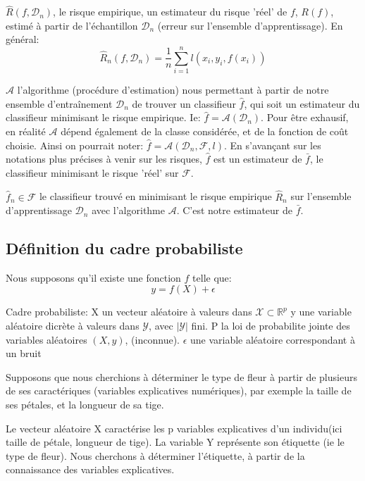 \documentclass[a4paper]{article}
\theoremstyle{plain}
\begin{document}
\begin{outline}
\2 $\hat R(f, \mathcal{D}_n)$, le risque empirique, un estimateur du risque 'réel' de $f$, $R(f)$, estimé à partir de l'échantillon $\mathcal{D}_n$ (erreur sur l'ensemble d'apprentissage). En général: $$\hat R_n(f, \mathcal{D}_n) = \frac{1}{n}\sum_{i=1}^{n}\mathit{l}(x_i,y_i,f(x_i))$$

\2 $\mathcal{A}$ l'algorithme (procédure d'estimation) nous permettant à partir de notre ensemble d'entraînement $\mathcal{D}_n$ de trouver un classifieur $\hat f$, qui soit un estimateur du classifieur minimisant le risque empirique. Ie: $\hat f = \mathcal{A}(\mathcal{D}_n) $. Pour être exhausif, en réalité $\mathcal{A}$ dépend également de la classe considérée, et de la fonction de coût choisie. Ainsi on pourrait noter: $\hat f = \mathcal{A}(\mathcal{D}_n,\mathcal{F},l)$. En s'avançant sur les notations plus précises à venir sur les risques, $\hat f$ est un estimateur de $\bar f$, le classifieur  minimisant le risque 'réel' sur $\mathcal{F}$.

\2 $\hat f_n \in \mathcal{F}$ le classifieur trouvé en minimisant le risque empirique $\hat R_n$ sur l'ensemble d'apprentissage $\mathcal{D}_n$ avec l'algorithme $\mathcal{A}$. C'est notre estimateur de $\bar f$.


\end{outline}

\subsection{Définition du cadre probabiliste}
Nous supposons qu'il existe une fonction $f$ telle que: 
$$ y = f(X) + \epsilon$$

\begin{outline}

\1 Cadre probabiliste:
\2 X un vecteur aléatoire à valeurs dans $\mathcal{X} \subset \mathbb{R}^p$
\2 y une variable aléatoire dicrète à valeurs dans $\mathcal{Y} $, avec $|\mathcal{Y}|$ fini.
\2 P la loi de probabilite jointe des variables aléatoires $(X,y)$, (inconnue).
\2 $\epsilon$ une variable aléatoire correspondant à un bruit

\end{outline}

Supposons que nous cherchions à déterminer le type de fleur à partir de plusieurs de ses caractériques (variables explicatives numériques), par exemple la taille de ses pétales, et la longueur de sa tige.

Le vecteur aléatoire X caractérise les p variables explicatives d'un individu(ici taille de pétale, longueur de tige). La variable Y représente son étiquette (ie le type de fleur). Nous cherchons à déterminer l'étiquette, à partir de la connaissance des variables explicatives. 
\end{document}
